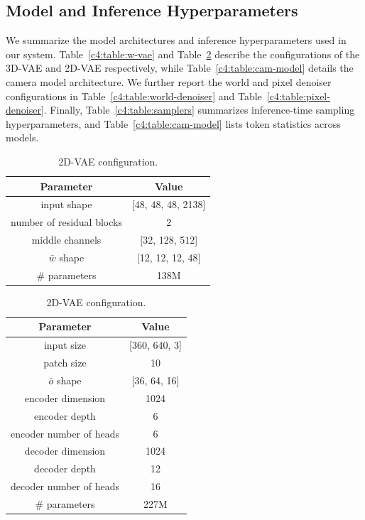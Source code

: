 \begin{subappendices}
\subsection{Model and Inference Hyperparameters}
We summarize the model architectures and inference hyperparameters used in our system. Table~\ref{c4:table:w-vae} and Table~\ref{c4:table:p-vae} describe the configurations of the 3D-VAE and 2D-VAE respectively, while Table~\ref{c4:table:cam-model} details the camera model architecture. We further report the world and pixel denoiser configurations in Table~\ref{c4:table:world-denoiser} and Table~\ref{c4:table:pixel-denoiser}. Finally, Table~\ref{c4:table:samplers} summarizes inference-time sampling hyperparameters, and Table~\ref{c4:table:cam-model} lists token statistics across models.



\begin{table}[htbp]
\centering
\scriptsize
\setlength{\tabcolsep}{4pt}

\begin{minipage}[t]{0.48\textwidth}
\centering

\caption{3D-VAE configuration.}
\label{c4:table:w-vae}
\begin{tabular}{cc}\toprule
Parameter & Value \\
\midrule
input shape & [48, 48, 48, 2138] \\
number of residual blocks & 2 \\
middle channels & [32, 128, 512] \\
$\bar{w}$ shape & [12, 12, 12, 48] \\
\# parameters & 138M \\
\bottomrule
\end{tabular}

\vspace{0.8em}

\caption{2D-VAE configuration.}
\label{c4:table:p-vae}
\begin{tabular}{cc}\toprule
Parameter & Value \\
\midrule
input size & [360, 640, 3] \\
patch size & 10 \\
$\bar{o}$ shape & [36, 64, 16] \\
encoder dimension & 1024 \\
encoder depth & 6 \\
encoder number of heads & 6 \\
decoder dimension & 1024 \\
decoder depth & 12 \\
decoder number of heads & 16 \\
\# parameters & 227M \\
\bottomrule
\end{tabular}


\end{minipage}
\end{table}
\end{subappendices}
